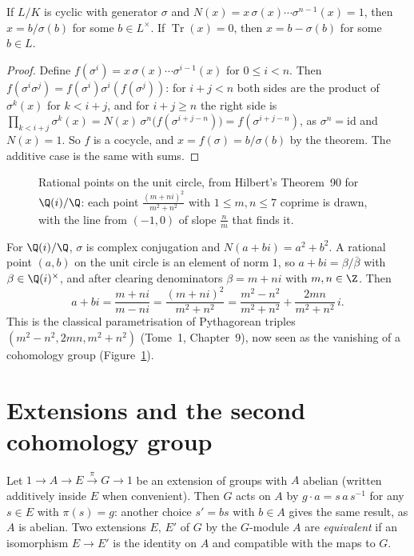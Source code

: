 \begin{corollary}\label{cor:hilbert90}
If $L/K$ is cyclic with generator $\sigma$ and $N(x)=x\,\sigma(x)\cdots\sigma^{n-1}(x)=1$, then $x=b/\sigma(b)$ for some $b\in L^\times$. If $\operatorname{Tr}(x)=0$, then $x=b-\sigma(b)$ for some $b\in L$.
\end{corollary}

\begin{proof}
Define $f(\sigma^i)=x\,\sigma(x)\cdots\sigma^{i-1}(x)$ for $0\le i<n$. Then $f(\sigma^i\sigma^j)=f(\sigma^i)\sigma^i(f(\sigma^j))$: for $i+j<n$ both sides are the product of $\sigma^k(x)$ for $k<i+j$, and for $i+j\ge n$ the right side is
$\prod_{k<i+j}\sigma^k(x)=N(x)\,\sigma^n\bigl(f(\sigma^{i+j-n})\bigr)=f(\sigma^{i+j-n})$, as $\sigma^n=\mathrm{id}$ and $N(x)=1$. So $f$ is a cocycle, and $x=f(\sigma)=b/\sigma(b)$ by the theorem. The additive case is the same with sums.
\end{proof}

\begin{figure}[ht]
\centering
{}
\caption{Rational points on the unit circle, from Hilbert's Theorem~90 for $\Q(i)/\Q$: each point $\frac{(m+ni)^2}{m^2+n^2}$ with $1\le m,n\le7$ coprime is drawn, with the line from $(-1,0)$ of slope $\frac nm$ that finds it.}
\label{fig:rationalcircle}
\end{figure}

\begin{example}\label{ex:pythagoras}
For $\Q(i)/\Q$, $\sigma$ is complex conjugation and $N(a+bi)=a^2+b^2$. A rational point $(a,b)$ on the unit circle is an element of norm $1$, so $a+bi=\beta/\bar\beta$ with $\beta\in\Q(i)^\times$, and after clearing denominators
$\beta=m+ni$ with $m,n\in\Z$. Then
\[
a+bi=\frac{m+ni}{m-ni}=\frac{(m+ni)^2}{m^2+n^2}=\frac{m^2-n^2}{m^2+n^2}+\frac{2mn}{m^2+n^2}\,i.
\]
This is the classical parametrisation of Pythagorean triples $(m^2-n^2,2mn,m^2+n^2)$ (Tome~1, Chapter~9), now seen as the vanishing of a cohomology group (Figure~\ref{fig:rationalcircle}).
\end{example}

\section{Extensions and the second cohomology group}\label{sec:extensions}

Let $1\to A\xrightarrow{}E\xrightarrow{\pi}G\to1$ be an extension of groups with $A$ abelian (written additively inside $E$ when convenient). Then $G$ acts on $A$ by $g\cdot a=s\,a\,s^{-1}$ for any $s\in E$ with $\pi(s)=g$: another
choice $s'=bs$ with $b\in A$ gives the same result, as $A$ is abelian. Two extensions $E$, $E'$ of $G$ by the $G$-module $A$ are \emph{equivalent} if an isomorphism $E\to E'$ is the identity on $A$ and compatible with the maps to $G$.


